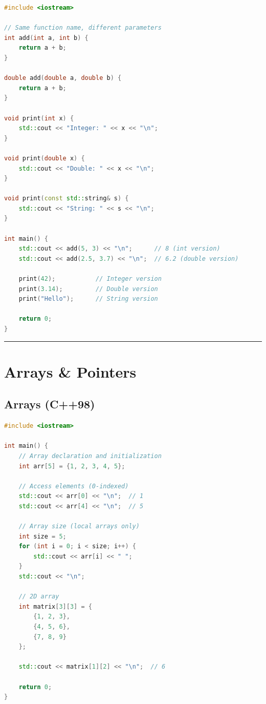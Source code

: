 \begin{lstlisting}[language={C++}]
#include <iostream>

// Same function name, different parameters
int add(int a, int b) {
    return a + b;
}

double add(double a, double b) {
    return a + b;
}

void print(int x) {
    std::cout << "Integer: " << x << "\n";
}

void print(double x) {
    std::cout << "Double: " << x << "\n";
}

void print(const std::string& s) {
    std::cout << "String: " << s << "\n";
}

int main() {
    std::cout << add(5, 3) << "\n";      // 8 (int version)
    std::cout << add(2.5, 3.7) << "\n";  // 6.2 (double version)
    
    print(42);           // Integer version
    print(3.14);         // Double version
    print("Hello");      // String version
    
    return 0;
}
\end{lstlisting}

\begin{center}\rule{0.5\linewidth}{0.5pt}\end{center}

\hypertarget{arrays-pointers}{%
\section{Arrays \& Pointers}\label{arrays-pointers}}

\hypertarget{arrays-c98}{%
\subsection{Arrays (C++98)}\label{arrays-c98}}

\begin{lstlisting}[language={C++}]
#include <iostream>

int main() {
    // Array declaration and initialization
    int arr[5] = {1, 2, 3, 4, 5};
    
    // Access elements (0-indexed)
    std::cout << arr[0] << "\n";  // 1
    std::cout << arr[4] << "\n";  // 5
    
    // Array size (local arrays only)
    int size = 5;
    for (int i = 0; i < size; i++) {
        std::cout << arr[i] << " ";
    }
    std::cout << "\n";
    
    // 2D array
    int matrix[3][3] = {
        {1, 2, 3},
        {4, 5, 6},
        {7, 8, 9}
    };
    
    std::cout << matrix[1][2] << "\n";  // 6
    
    return 0;
}
\end{lstlisting}

